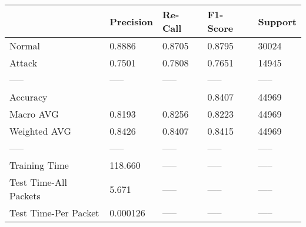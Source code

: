 \begin{tabular}{lllll}
\toprule
{} & Precision & Re-Call & F1-Score & Support \\
\midrule
Normal                &    0.8886 &  0.8705 &   0.8795 &   30024 \\
Attack                &    0.7501 &  0.7808 &   0.7651 &   14945 \\
-----                 &     ----- &   ----- &    ----- &   ----- \\
Accuracy              &           &         &   0.8407 &   44969 \\
Macro AVG             &    0.8193 &  0.8256 &   0.8223 &   44969 \\
Weighted AVG          &    0.8426 &  0.8407 &   0.8415 &   44969 \\
-----                 &     ----- &   ----- &    ----- &   ----- \\
Training Time         &   118.660 &   ----- &    ----- &   ----- \\
Test Time-All Packets &     5.671 &   ----- &    ----- &   ----- \\
Test Time-Per Packet  &  0.000126 &   ----- &    ----- &   ----- \\
\bottomrule
\end{tabular}
